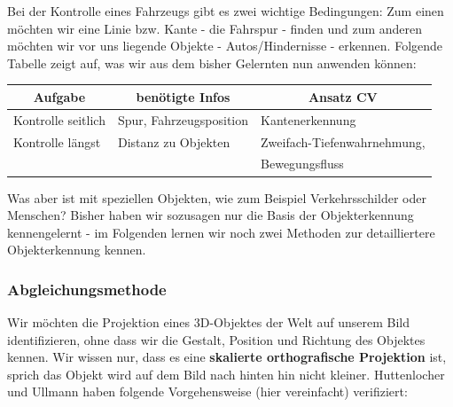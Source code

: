 Bei der Kontrolle eines Fahrzeugs gibt es zwei wichtige Bedingungen: Zum einen möchten wir eine Linie bzw. Kante - die Fahrspur - finden und zum anderen möchten wir vor uns liegende Objekte - Autos/Hindernisse - erkennen. Folgende Tabelle zeigt auf, was wir aus dem bisher Gelernten nun anwenden können:
\begin{table}[h]
\centering
\label{Tab. 3.2}
\begin{tabular}{@{}lll@{}}
\toprule
\multicolumn{1}{c}{\textbf{Aufgabe}} & \multicolumn{1}{c}{\textbf{benötigte Infos}} & \multicolumn{1}{c}{\textbf{Ansatz CV}} \\ \midrule
Kontrolle seitlich & Spur, Fahrzeugsposition & Kantenerkennung \\
Kontrolle längst & Distanz zu Objekten & Zweifach-Tiefenwahrnehmung, \\&&Bewegungsfluss \\ \bottomrule
\end{tabular}
\end{table}

Was aber ist mit speziellen Objekten, wie zum Beispiel Verkehrsschilder oder Menschen? Bisher haben wir sozusagen nur die Basis der Objekterkennung kennengelernt - im Folgenden lernen wir noch zwei Methoden zur detailliertere Objekterkennung kennen.

\subsubsection{Abgleichungsmethode}

Wir möchten die Projektion eines 3D-Objektes der Welt auf unserem Bild identifizieren, ohne dass wir die Gestalt, Position und Richtung des Objektes kennen. Wir wissen nur, dass es eine \textbf{skalierte orthografische Projektion} ist, sprich das Objekt wird auf dem Bild nach hinten hin nicht kleiner.
Huttenlocher und \mbox{Ullmann} haben folgende Vorgehensweise (hier vereinfacht) verifiziert:

